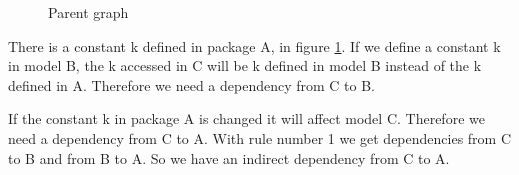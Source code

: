 \documentclass{cslthse-msc}
\begin{document}
\begin{figure}[H]
    \centering
    \qquad
    \subfloat{\raisebox{3.2 cm}{}}
    \caption{Parent graph}
    \label{fig:parentGraph}
\end{figure}

There is a constant k defined in package A, in figure \ref{fig:parentGraph}. If we define a constant k in model B, the k accessed in C will be k defined in model B instead of the k defined in A. Therefore we need a dependency from C to B.

If the constant k in package A is changed it will affect model C. Therefore we need a dependency from C to A. With rule number 1 we get dependencies from C to B and from B to A. So we have an indirect dependency from C to A.
\end{document}
